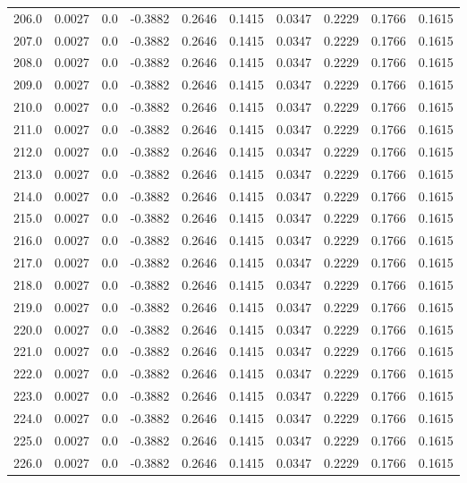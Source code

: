 \begin{longtable}{lrrrrrrrrr}
206.0 & 0.0027 & 0.0 & -0.3882 & 0.2646 & 0.1415 & 0.0347 & 0.2229 & 0.1766 & 0.1615 \\
207.0 & 0.0027 & 0.0 & -0.3882 & 0.2646 & 0.1415 & 0.0347 & 0.2229 & 0.1766 & 0.1615 \\
208.0 & 0.0027 & 0.0 & -0.3882 & 0.2646 & 0.1415 & 0.0347 & 0.2229 & 0.1766 & 0.1615 \\
209.0 & 0.0027 & 0.0 & -0.3882 & 0.2646 & 0.1415 & 0.0347 & 0.2229 & 0.1766 & 0.1615 \\
210.0 & 0.0027 & 0.0 & -0.3882 & 0.2646 & 0.1415 & 0.0347 & 0.2229 & 0.1766 & 0.1615 \\
211.0 & 0.0027 & 0.0 & -0.3882 & 0.2646 & 0.1415 & 0.0347 & 0.2229 & 0.1766 & 0.1615 \\
212.0 & 0.0027 & 0.0 & -0.3882 & 0.2646 & 0.1415 & 0.0347 & 0.2229 & 0.1766 & 0.1615 \\
213.0 & 0.0027 & 0.0 & -0.3882 & 0.2646 & 0.1415 & 0.0347 & 0.2229 & 0.1766 & 0.1615 \\
214.0 & 0.0027 & 0.0 & -0.3882 & 0.2646 & 0.1415 & 0.0347 & 0.2229 & 0.1766 & 0.1615 \\
215.0 & 0.0027 & 0.0 & -0.3882 & 0.2646 & 0.1415 & 0.0347 & 0.2229 & 0.1766 & 0.1615 \\
216.0 & 0.0027 & 0.0 & -0.3882 & 0.2646 & 0.1415 & 0.0347 & 0.2229 & 0.1766 & 0.1615 \\
217.0 & 0.0027 & 0.0 & -0.3882 & 0.2646 & 0.1415 & 0.0347 & 0.2229 & 0.1766 & 0.1615 \\
218.0 & 0.0027 & 0.0 & -0.3882 & 0.2646 & 0.1415 & 0.0347 & 0.2229 & 0.1766 & 0.1615 \\
219.0 & 0.0027 & 0.0 & -0.3882 & 0.2646 & 0.1415 & 0.0347 & 0.2229 & 0.1766 & 0.1615 \\
220.0 & 0.0027 & 0.0 & -0.3882 & 0.2646 & 0.1415 & 0.0347 & 0.2229 & 0.1766 & 0.1615 \\
221.0 & 0.0027 & 0.0 & -0.3882 & 0.2646 & 0.1415 & 0.0347 & 0.2229 & 0.1766 & 0.1615 \\
222.0 & 0.0027 & 0.0 & -0.3882 & 0.2646 & 0.1415 & 0.0347 & 0.2229 & 0.1766 & 0.1615 \\
223.0 & 0.0027 & 0.0 & -0.3882 & 0.2646 & 0.1415 & 0.0347 & 0.2229 & 0.1766 & 0.1615 \\
224.0 & 0.0027 & 0.0 & -0.3882 & 0.2646 & 0.1415 & 0.0347 & 0.2229 & 0.1766 & 0.1615 \\
225.0 & 0.0027 & 0.0 & -0.3882 & 0.2646 & 0.1415 & 0.0347 & 0.2229 & 0.1766 & 0.1615 \\
226.0 & 0.0027 & 0.0 & -0.3882 & 0.2646 & 0.1415 & 0.0347 & 0.2229 & 0.1766 & 0.1615 \\

\end{longtable}

